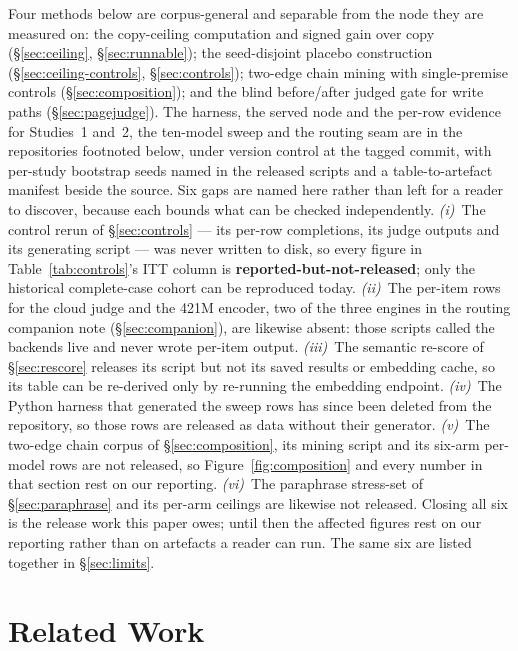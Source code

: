 \documentclass[10pt,twocolumn]{article}
\begin{document}
Four methods below are corpus-general and separable from the node they are measured on: the copy-ceiling computation and signed gain over copy (\S\ref{sec:ceiling}, \S\ref{sec:runnable}); the seed-disjoint placebo construction (\S\ref{sec:ceiling-controls}, \S\ref{sec:controls}); two-edge chain mining with single-premise controls (\S\ref{sec:composition}); and the blind before/after judged gate for write paths (\S\ref{sec:pagejudge}). The harness, the served node and the per-row evidence for Studies~1 and~2, the ten-model sweep and the routing seam are in the repositories footnoted below, under version control at the tagged commit, with per-study bootstrap seeds named in the released scripts and a table-to-artefact manifest beside the source. Six gaps are named here rather than left for a reader to discover, because each bounds what can be checked independently. \emph{(i)}~The control rerun of \S\ref{sec:controls} --- its per-row completions, its judge outputs and its generating script --- was never written to disk, so every figure in Table~\ref{tab:controls}'s ITT column is \textbf{reported-but-not-released}; only the historical complete-case cohort can be reproduced today. \emph{(ii)}~The per-item rows for the cloud judge and the 421M encoder, two of the three engines in the routing companion note (\S\ref{sec:companion}), are likewise absent: those scripts called the backends live and never wrote per-item output. \emph{(iii)}~The semantic re-score of \S\ref{sec:rescore} releases its script but not its saved results or embedding cache, so its table can be re-derived only by re-running the embedding endpoint. \emph{(iv)}~The Python harness that generated the sweep rows has since been deleted from the repository, so those rows are released as data without their generator. \emph{(v)}~The two-edge chain corpus of \S\ref{sec:composition}, its mining script and its six-arm per-model rows are not released, so Figure~\ref{fig:composition} and every number in that section rest on our reporting. \emph{(vi)}~The paraphrase stress-set of \S\ref{sec:paraphrase} and its per-arm ceilings are likewise not released. Closing all six is the release work this paper owes; until then the affected figures rest on our reporting rather than on artefacts a reader can run. The same six are listed together in \S\ref{sec:limits}.

\section{Related Work}\label{sec:related}
\end{document}
